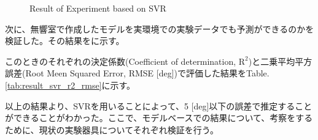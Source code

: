 \begin{figure}[ht]
    \centering
    \label{fig:result_svr_anechoic}
    \vspace{2zh}
    \label{fig:result_svr_real}
    \vspace{1zh}
    \caption{Result of Experiment based on SVR}
    \label{fig:result_svr_1}
\end{figure}

次に、無響室で作成したモデルを実環境での実験データでも予測ができるのかを検証した。その結果をに示す。

このときのそれぞれの決定係数(Coefficient of determination, $\mathrm{R}^2$)と二乗平均平方誤差(Root Meen Squared Error, RMSE [deg])で評価した結果をTable. \ref{tab:result_svr_r2_rmse}に示す。

以上の結果より、SVRを用いることによって、5 [deg]以下の誤差で推定することができることがわかった。ここで、モデルベースでの結果について、考察をするために、現状の実験器具についてそれぞれ検証を行う。

